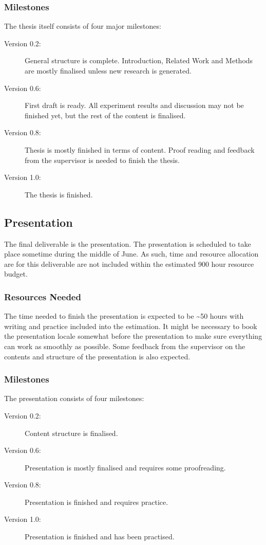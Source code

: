 \subsubsection{Milestones}
The thesis itself consists of four major milestones:

\begin{description}
\item[Version 0.2: ] General structure is complete. Introduction, Related Work and Methods are mostly finalised unless new research is generated.
\item[Version 0.6: ] First draft is ready. All experiment results and discussion may not be finished yet, but the rest of the content is finalised. 
\item[Version 0.8: ] Thesis is mostly finished in terms of content. Proof reading and feedback from the supervisor is needed to finish the thesis. 
\item[Version 1.0: ] The thesis is finished.
\end{description}

\subsection{Presentation}
The final deliverable is the presentation. The presentation is scheduled to take place sometime during the middle of June. As such, time and resource allocation are for this deliverable are not included within the estimated 900 hour resource budget. 
\subsubsection{Resources Needed}
The time needed to finish the presentation is expected to be \textasciitilde 50 hours with writing and practice included into the estimation. It might be necessary to book the presentation locale somewhat before the presentation to make sure everything can work as smoothly as possible. Some feedback from the supervisor on the contents and structure of the presentation is also expected.

\subsubsection{Milestones}
The presentation consists of four milestones:
\begin{description}
\item[Version 0.2: ] Content structure is finalised. 
\item[Version 0.6: ] Presentation is mostly finalised and requires some proofreading.  
\item[Version 0.8: ] Presentation is finished and requires practice. 
\item[Version 1.0: ] Presentation is finished and has been practised.
\end{description}


